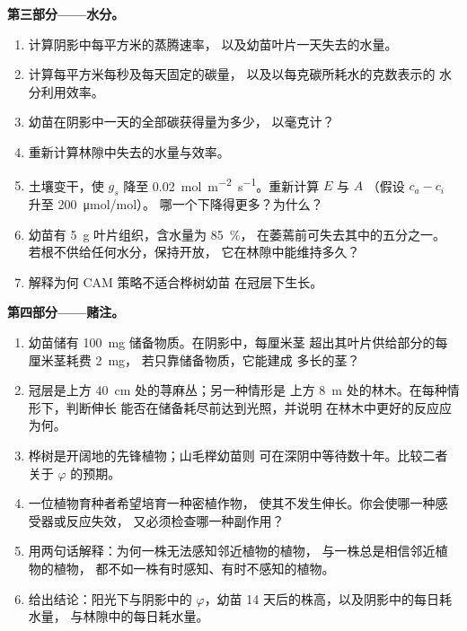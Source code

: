 \begin{problem}
\medskip
\noindent\textbf{第三部分——水分。}
\begin{enumerate}[resume]
  \item 计算阴影中每平方米的蒸腾速率，
        以及幼苗叶片一天失去的水量。
  \item 计算每平方米每秒及每天固定的碳量，
        以及以每克碳所耗水的克数表示的
        水分利用效率。
  \item 幼苗在阴影中一天的全部碳获得量为多少，
        以毫克计？
  \item 重新计算林隙中失去的水量与效率。
  \item 土壤变干，使 $g_s$ 降至
        \qty{0.02}{mol.m^{-2}.s^{-1}}。重新计算 $E$ 与 $A$
        （假设 $c_a - c_i$ 升至 \qty{200}{\micro mol/mol}）。
        哪一个下降得更多？为什么？
  \item 幼苗有 \qty{5}{g} 叶片组织，含水量为 \qty{85}{\%}，
        在萎蔫前可失去其中的五分之一。
        若根不供给任何水分，保持开放，
        它在林隙中能维持多久？
  \item 解释为何 CAM 策略不适合桦树幼苗
        在冠层下生长。
\end{enumerate}

\medskip
\noindent\textbf{第四部分——赌注。}
\begin{enumerate}[resume]
  \item 幼苗储有 \qty{100}{mg} 储备物质。在阴影中，每厘米茎
        超出其叶片供给部分的每厘米茎耗费 \qty{2}{mg}，
        若只靠储备物质，它能建成
        多长的茎？
  \item 冠层是上方 \qty{40}{cm} 处的荨麻丛；另一种情形是
        上方 \qty{8}{m} 处的林木。在每种情形下，判断伸长
        能否在储备耗尽前达到光照，并说明
        在林木中更好的反应应为何。
  \item 桦树是开阔地的先锋植物；山毛榉幼苗则
        可在深阴中等待数十年。比较二者
        关于 $\varphi$ 的预期。
  \item 一位植物育种者希望培育一种密植作物，
        使其不发生伸长。你会使哪一种感受器或反应失效，
        又必须检查哪一种副作用？
  \item 用两句话解释：为何一株无法感知邻近植物的植物，
        与一株总是相信邻近植物的植物，
        都不如一株有时感知、有时不感知的植物。
  \item 给出结论：阳光下与阴影中的 $\varphi$，幼苗
        14 天后的株高，以及阴影中的每日耗水量，
        与林隙中的每日耗水量。
\end{enumerate}
\end{problem}
